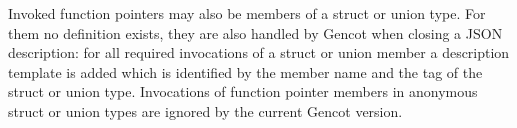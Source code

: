 Invoked function pointers may also be members of a struct or union type. For them no definition exists, they are also 
handled by Gencot when closing a JSON description: for all required invocations of a struct or union member a 
description template is added which is identified by the member name and the tag of the struct or union type. Invocations
of function pointer members in anonymous struct or union types are ignored by the current Gencot version.
 
